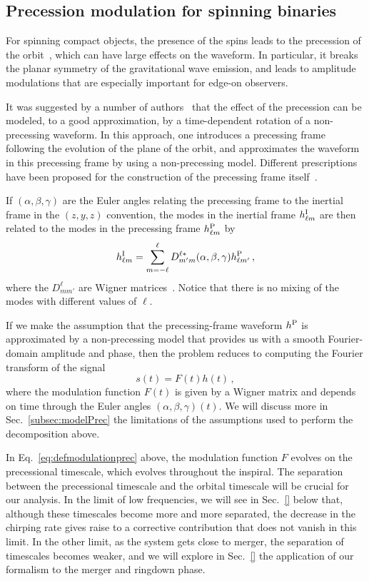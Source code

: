 \documentclass[aps,showpacs,%
prd,superscriptaddress,nofootinbib]{revtex4}
\newcommand{\be}{\begin{equation}}
\newcommand{\ee}{\end{equation}}
\begin{document}

\subsection{Precession modulation for spinning binaries}
\label{subsec:modulationPrec}

For spinning compact objects, the presence of the spins leads to the precession of the orbit~\cite{Apostolatos+94, Kidder95}, which can have large effects on the waveform. In particular, it breaks the planar symmetry of the gravitational wave emission, and leads to amplitude modulations that are especially important for edge-on observers.

It was suggested by a number of authors~\cite{} that the effect of the precession can be modeled, to a good approximation, by a time-dependent rotation of a non-precessing waveform. In this approach, one introduces a precessing frame following the evolution of the plane of the orbit, and approximates the waveform in this precessing frame by using a non-precessing model. Different prescriptions have been proposed for the construction of the precessing frame itself~\cite{}.

If $(\alpha, \beta, \gamma)$ are the Euler angles relating the precessing frame to the inertial frame in the $(z,y,z)$ convention, the modes in the inertial frame $h_{\ell m}^{\rm I}$ are then related to the modes in the precessing frame $h_{\ell m}^{\rm P}$ by~\cite{Goldberg+67}
\be\label{eq:wignerrot}
	h_{\ell m}^{\rm I} = \sum\limits_{m=-\ell}^{\ell} D^{\ell *}_{m'm} (\alpha,\beta,\gamma) h_{\ell m'}^{\rm P} \,,
\ee
where the $D^{\ell}_{mm'}$ are Wigner matrices~\cite{}. Notice that there is no mixing of the modes with different values of $\ell$.

If we make the assumption that the precessing-frame waveform $h^{\rm P}$ is approximated by a non-precessing model that provides us with a smooth Fourier-domain amplitude and phase, then the problem reduces to computing the Fourier transform of the signal
\be\label{eq:defmodulationprec}
	s(t) = F(t) h(t) \,,
\ee
where the modulation function $F(t)$ is given by a Wigner matrix and depends on time through the Euler angles $(\alpha, \beta, \gamma)(t)$. We will discuss more in Sec.~\ref{subsec:modelPrec} the limitations of the assumptions used to perform the decomposition above.

In Eq.~\eqref{eq:defmodulationprec} above, the modulation function $F$ evolves on the precessional timescale, which evolves throughout the inspiral. The separation between the precessional timescale and the orbital timescale will be crucial for our analysis. In the limit of low frequencies, we will see in Sec.~\ref{} below that, although these timescales become more and more separated, the decrease in the chirping rate gives raise to a corrective contribution that does not vanish in this limit. In the other limit, as the system gets close to merger, the separation of timescales becomes weaker, and we will explore in Sec.~\ref{} the application of our formalism to the merger and ringdown phase.
\end{document}
